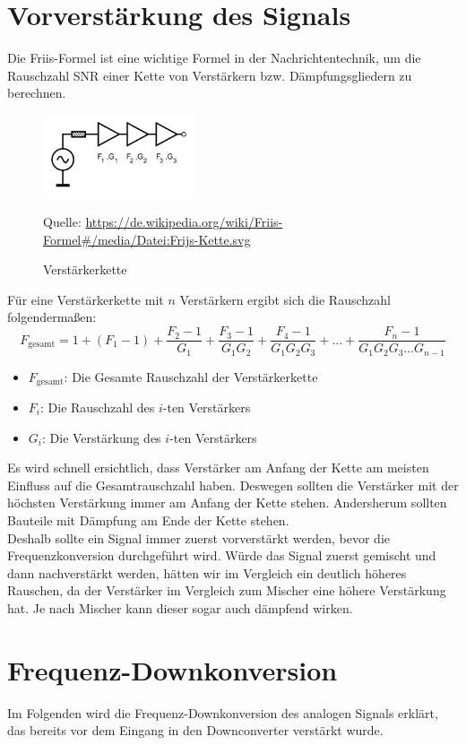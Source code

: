 \section{Vorverstärkung des Signals} %
Die Friis-Formel ist eine wichtige Formel in der Nachrichtentechnik, um die Rauschzahl SNR einer Kette von Verstärkern
bzw. Dämpfungsgliedern zu berechnen.

\begin{figure}[H]
    \centering
    \includegraphics[width=0.4\textwidth]{Pictures/Frijs-Kette.svg.png}
    \caption{Verstärkerkette}
    \footnotesize{Quelle: \url{https://de.wikipedia.org/wiki/Friis-Formel#/media/Datei:Frijs-Kette.svg}}
\end{figure}
Für eine Verstärkerkette mit $n$ Verstärkern ergibt sich die Rauschzahl folgendermaßen:
\begin{equation}
    F_{\text{gesamt}} = 1 + (F_1 - 1) + \frac{F_2 - 1}{G_1} + \frac{F_3 - 1}{G_1 G_2} + \frac{F_4 - 1}{G_1 G_2 G_3} + \dots + \frac{F_n - 1}{G_1 G_2 G_3 \dots G_{n-1}}
\end{equation}
\begin{itemize}
    \item $F_{\text{gesamt}}$: Die Gesamte Rauschzahl der Verstärkerkette
    \item $F_i$: Die Rauschzahl des $i$-ten Verstärkers
    \item $G_i$: Die Verstärkung des $i$-ten Verstärkers
\end{itemize}
Es wird schnell ersichtlich, dass Verstärker am Anfang der Kette am meisten Einfluss auf die Gesamtrauschzahl haben.
Deswegen sollten die Verstärker mit der höchsten Verstärkung immer am Anfang der Kette stehen. Andersherum sollten Bauteile mit Dämpfung am Ende der Kette stehen.
\\
Deshalb sollte ein Signal immer zuerst vorverstärkt werden, bevor die Frequenzkonversion durchgeführt wird.
Würde das Signal zuerst gemischt und dann nachverstärkt werden, hätten wir im Vergleich ein deutlich höheres Rauschen,
da der Verstärker im Vergleich zum Mischer eine höhere Verstärkung hat. Je nach Mischer kann dieser sogar auch dämpfend wirken.
\section{Frequenz-Downkonversion} %
Im Folgenden wird die Frequenz-Downkonversion des analogen Signals erklärt, das bereits vor dem Eingang in den Downconverter verstärkt wurde.

